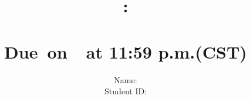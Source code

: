 \documentclass{article}
\title{
    \vspace{2in}
    \textmd{\textbf{\hmwkClass:\\  \hmwkTitle}} \\
    \normalsize\vspace{0.1in}\small{Due\ on\ \hmwkDueDate\ at 11:59 p.m.(CST)} \\
	\vspace{4in}
}
\author{
	Name: \textbf{\hmwkAuthorName} \\
	Student ID: \hmwkAuthorID}
\date{}
\begin{document}
\maketitle
\pagebreak




\end{document}
